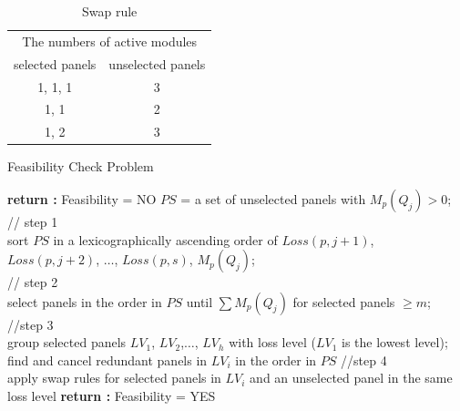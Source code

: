 \documentclass[conference]{pvsctran}
\begin{document}
\begin{table}[ht]
\caption{Swap rule}
\label{tab:swap}
\centering
\begin{tabular}{c|c}
\hline\hline
\multicolumn{2}{c}{The numbers of active modules} \\
selected panels & unselected panels \\ \hline
1, 1, 1 & 3 \\ \hline
1, 1 & 2 \\ \hline
1, 2 & 3 \\ \hline
\end{tabular}
\end{table}

\begin{algorithm}[htp]
\caption{Feasibility Check Problem}
\label{alg1}
\LinesNumbered
{}  
    {{
       {\textup{\textbf{return :}} Feasibility = NO}}
     $PS$ = a set of unselected panels with $M_{p}(Q_{j}) > 0$;\\
     // step 1\\
     sort $PS$ in a lexicographically ascending order of $Loss(p,j+1)$, $Loss(p,j+2)$, $\ldots$, $Loss(p,s)$, $M_{p}(Q_{j})$;\\
     // step 2\\
     select panels in the order in $PS$ until $\sum M_{p}(Q_{j})$ for selected panels $\geq m$;\\
     //step 3\\
     group selected panels $LV_{1}$, $LV_{2}$,$\ldots$, $LV_{h}$ with loss level ($LV_{1}$ is the lowest level);\\
     {find and cancel redundant panels in $LV_{i}$ in the order in $PS$}
     //step 4\\
     {apply swap rules for selected panels in $LV_{i}$ and an unselected panel in the same loss level}
    }
    \textup{\textbf{return :}} Feasibility = YES
\end{algorithm}
\end{document}
